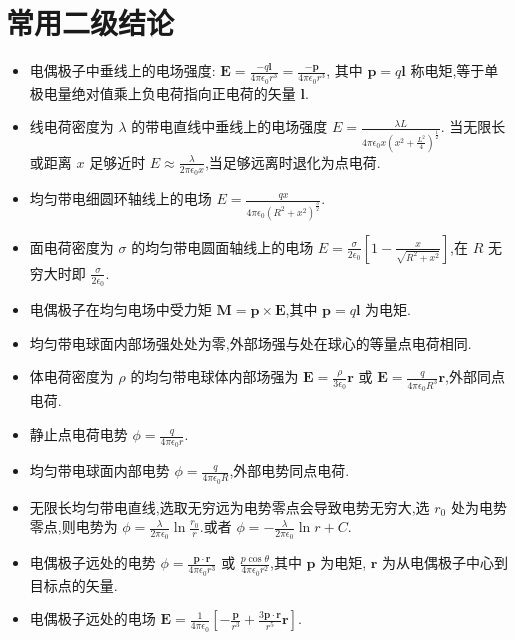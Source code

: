     \section{常用二级结论}
    \begin{itemize}
        \item 电偶极子中垂线上的电场强度: $\bm{E}=\frac{-q \bm{l}}{4\pi\epsilon_0r^3}=\frac{-\bm{p}}{4\pi\epsilon_0r^3}$, 其中 $\bm{p}=q\bm{l}$ 称电矩,等于单极电量绝对值乘上负电荷指向正电荷的矢量 $\bm{l}$.
        \item 线电荷密度为 $\lambda$ 的带电直线中垂线上的电场强度 $E=\frac{\lambda L}{4\pi\epsilon_0 x(x^2+\frac{L^2}{4})^{\frac{1}{2}}}$. 当无限长或距离 $x$ 足够近时 $E\approx \frac{\lambda}{2\pi\epsilon_0 x}$,当足够远离时退化为点电荷.
        \item 均匀带电细圆环轴线上的电场 $E=\frac{qx}{4\pi\epsilon_0(R^2+x^2)^{\frac{3}{2}}}$.
        \item 面电荷密度为 $\sigma$ 的均匀带电圆面轴线上的电场 $E=\frac{\sigma}{2\epsilon_0}\left[1-\frac{x}{\sqrt{R^2+x^2}}\right]$,在 $R$ 无穷大时即 $\frac{\sigma}{2\epsilon_0}$.
        \item 电偶极子在均匀电场中受力矩 $\bm{M}=\bm{p}\times \bm{E}$,其中 $\bm{p}=q \bm{l}$ 为电矩.
        \item 均匀带电球面内部场强处处为零,外部场强与处在球心的等量点电荷相同.
        \item 体电荷密度为 $\rho$ 的均匀带电球体内部场强为 $\bm{E}=\frac{\rho}{3\epsilon_0}\bm{r}$ 或 $\bm{E}=\frac{q}{4\pi\epsilon_0 R^3}\bm{r}$,外部同点电荷.
        \item 静止点电荷电势 $\phi=\frac{q}{4\pi \epsilon_0r}$.
        \item 均匀带电球面内部电势 $\phi=\frac{q}{4\pi\epsilon_0R}$,外部电势同点电荷.
        \item 无限长均匀带电直线,选取无穷远为电势零点会导致电势无穷大,选 $r_0$ 处为电势零点,则电势为 $\phi=\frac{\lambda}{2\pi\epsilon_0}\ln \frac{r_0}{r}$.或者 $\phi=-\frac{\lambda}{2\pi\epsilon_0}\ln r+C$.
        \item 电偶极子远处的电势 $\phi=\frac{\bm{p}\cdot \bm{r}}{4\pi\epsilon_0r^3}$ 或 $\frac{p\cos \theta}{4\pi\epsilon_0r^2}$,其中 $\bm{p}$ 为电矩, $\bm{r}$ 为从电偶极子中心到目标点的矢量.
        \item 电偶极子远处的电场 $\bm{E}=\frac{1}{4\pi\epsilon_0}\left[-\frac{\bm{p}}{r^3}+\frac{3\bm{p}\cdot \bm{r}}{r^{5}}\bm{r}\right]$.

\end{itemize}
